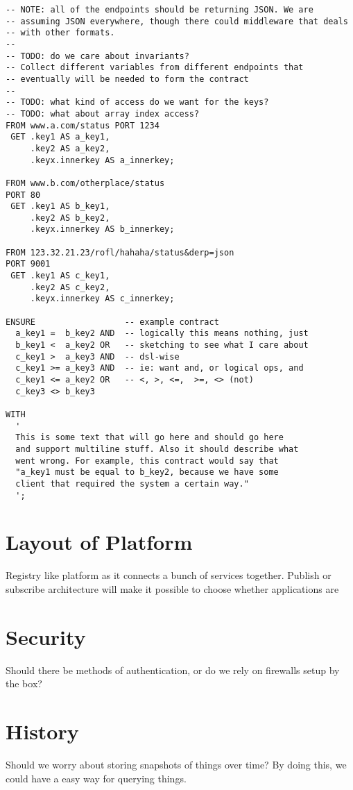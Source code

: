 \documentclass[12pt,twoside]{article}
\begin{document}
\begin{lstlisting}[language=nouscontract,caption='Sample Contract']
-- NOTE: all of the endpoints should be returning JSON. We are
-- assuming JSON everywhere, though there could middleware that deals
-- with other formats.
--
-- TODO: do we care about invariants?
-- Collect different variables from different endpoints that
-- eventually will be needed to form the contract
--
-- TODO: what kind of access do we want for the keys?
-- TODO: what about array index access?
FROM www.a.com/status PORT 1234
 GET .key1 AS a_key1,
     .key2 AS a_key2,
     .keyx.innerkey AS a_innerkey;

FROM www.b.com/otherplace/status
PORT 80
 GET .key1 AS b_key1,
     .key2 AS b_key2,
     .keyx.innerkey AS b_innerkey;

FROM 123.32.21.23/rofl/hahaha/status&derp=json
PORT 9001
 GET .key1 AS c_key1,
     .key2 AS c_key2,
     .keyx.innerkey AS c_innerkey;

ENSURE                  -- example contract
  a_key1 =  b_key2 AND  -- logically this means nothing, just
  b_key1 <  a_key2 OR   -- sketching to see what I care about
  c_key1 >  a_key3 AND  -- dsl-wise
  c_key1 >= a_key3 AND  -- ie: want and, or logical ops, and
  c_key1 <= a_key2 OR   -- <, >, <=,  >=, <> (not)
  c_key3 <> b_key3

WITH
  '
  This is some text that will go here and should go here
  and support multiline stuff. Also it should describe what
  went wrong. For example, this contract would say that
  "a_key1 must be equal to b_key2, because we have some
  client that required the system a certain way."
  ';
\end{lstlisting}

\section{Layout of Platform}
Registry like platform as it connects a bunch of services
together. Publish or subscribe architecture will make it possible to
choose whether applications are

\section{Security}
Should there be methods of authentication, or do we rely on firewalls
setup by the box?

\section{History}
Should we worry about storing snapshots of things over time? By
doing this, we could have a easy way for querying things.
\end{document}
